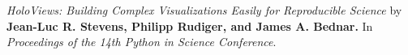 \documentclass[phd,ianc,twoside]{infthesis}
\begin{document}
\vspace{2em}

\emph{HoloViews: Building Complex Visualizations Easily for Reproducible Science} by {\bf Jean-Luc R. Stevens, Philipp Rudiger, and James A. Bednar.} In \emph{Proceedings of the 14th Python in Science Conference}.












\end{document}
